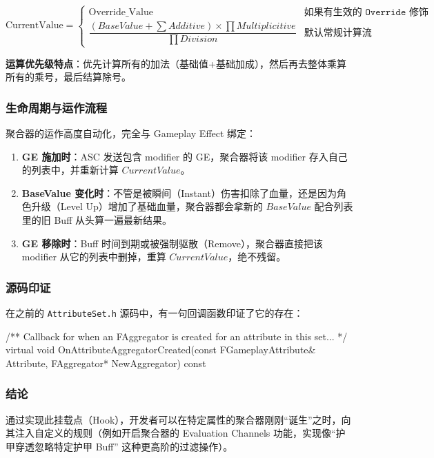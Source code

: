 \begin{equation*}
	\text{CurrentValue} = 
	\begin{cases} 
		\text{Override\_Value} & \texttt{如果有生效的 Override 修饰符} \\
		\dfrac{(BaseValue + \sum Additive) \times \prod Multiplicitive}{\prod Division} & \texttt{默认常规计算流}
	\end{cases}
\end{equation*}

\textbf{运算优先级特点}：优先计算所有的加法（基础值+基础加成），然后再去整体乘算所有的乘号，最后结算除号。

\subsubsection{生命周期与运作流程}
聚合器的运作高度自动化，完全与 Gameplay Effect 绑定：

\begin{enumerate}
	\item \textbf{GE 施加时}：ASC 发送包含 modifier 的 GE，聚合器将该 modifier 存入自己的列表中，并重新计算 $CurrentValue$。
	\item \textbf{BaseValue 变化时}：不管是被瞬间（Instant）伤害扣除了血量，还是因为角色升级（Level Up）增加了基础血量，聚合器都会拿新的 $BaseValue$ 配合列表里的旧 Buff 从头算一遍最新结果。
	\item \textbf{GE 移除时}：Buff 时间到期或被强制驱散（Remove），聚合器直接把该 modifier 从它的列表中删掉，重算 $CurrentValue$，绝不残留。
\end{enumerate}

\subsubsection{源码印证}
在之前的 \texttt{AttributeSet.h} 源码中，有一句回调函数印证了它的存在：

\begin{code}
	/** Callback for when an FAggregator is created for an attribute in this set... */
	virtual void OnAttributeAggregatorCreated(const FGameplayAttribute& Attribute, FAggregator* NewAggregator) const { }
\end{code}

\subsubsection{结论}通过实现此挂载点（Hook），开发者可以在特定属性的聚合器刚刚“诞生”之时，向其注入自定义的规则（例如开启聚合器的 Evaluation Channels 功能，实现像“护甲穿透忽略特定护甲 Buff” 这种更高阶的过滤操作）。
